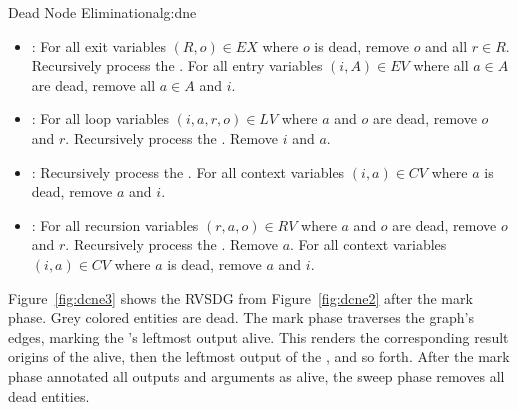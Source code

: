 \begin{informalg}{Dead Node Elimination}{alg:dne}
\begin{enumerate}
\begin{itemize}
			\item \bpoint{\gammanode}: For all exit variables $(R,o) \in EX$ where $o$ is dead, remove
				$o$ and all $r \in R$. Recursively process the \gammaregions. For all entry variables
				$(i,A) \in EV$ where all $a \in A$ are dead, remove all $a \in A$ and $i$.

			\item \bpoint{\thetanode}: For all loop variables $(i,a,r,o) \in LV$ where $a$ and $o$ are
				dead, remove $o$ and $r$. Recursively process the \thetaregion. Remove $i$ and $a$. 

			\item \bpoint{\lambdanode}: Recursively process the \lambdaregion. For all context variables
				$(i,a) \in CV$ where $a$ is dead, remove $a$ and $i$.

			\item \bpoint{\phinode}: For all recursion variables $(r, a, o) \in RV$ where $a$ and $o$ are
				dead, remove $o$ and $r$. Recursively process the \phiregion. Remove $a$. For all context
				variables $(i,a) \in CV$ where $a$ is dead, remove $a$ and $i$.
		\end{itemize}

	\vspace*{-\baselineskip}
\end{enumerate}
\end{informalg}

Figure~\ref{fig:dcne3} shows the RVSDG from Figure~\ref{fig:dcne2} after the mark phase.
Grey colored entities are dead. The mark phase traverses
the graph's edges, marking the \gammanode's leftmost output alive. This renders the
corresponding result origins of the \gammaregions alive, then the leftmost output of the
\thetanode, and so forth. After the mark phase annotated all outputs and arguments as alive, the
sweep phase removes all dead entities.

